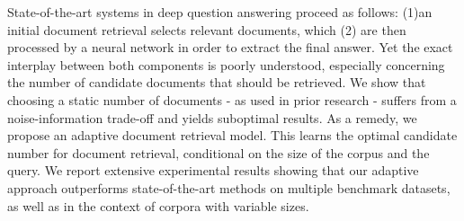 State-of-the-art systems in deep question answering proceed as follows: (1)an initial document retrieval selects relevant documents, which (2) are then processed by a neural network in order to extract the final answer. Yet the exact interplay between both components is poorly understood, especially concerning the number of candidate documents that should be retrieved. We show that choosing a static number of documents - as used in prior research - suffers from a noise-information trade-off and yields suboptimal results. As a remedy, we propose an adaptive document retrieval model. This learns the optimal candidate number for document retrieval, conditional on the size of the corpus and the query. We report extensive experimental results showing that our adaptive approach outperforms state-of-the-art methods on multiple benchmark datasets, as well as in the context of corpora with variable sizes.
